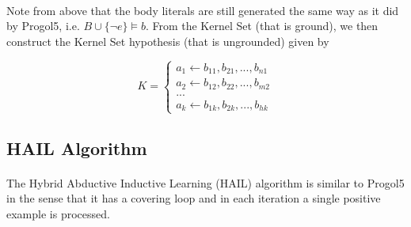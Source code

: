 \documentclass{article}
\theoremstyle{plain}
\theoremstyle{definition}
\begin{document}
\begin{multicols}{2}
\paragraph{} Note from above that the body literals are still generated the same way as it did by Progol5, i.e. $B \cup \{\lnot e\} \models b$. From the Kernel Set (that is ground), we then construct the Kernel Set hypothesis (that is ungrounded) given by

\[ 
K = \begin{cases}
a_1 \leftarrow b_{11}, b_{21}, ..., b_{n1}\\
a_2 \leftarrow b_{12}, b_{22}, ..., b_{m2}\\
...\\
a_k \leftarrow b_{1k}, b_{2k}, ..., b_{hk}
\end{cases}
\]

\subsection{HAIL Algorithm}

\paragraph{} The Hybrid Abductive Inductive Learning (HAIL) algorithm is similar to Progol5 in the sense that it has a covering loop and in each iteration a single positive example is processed.


\end{multicols}
\end{document}
